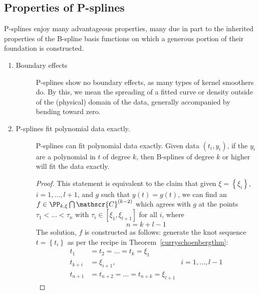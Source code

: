 \documentclass[12pt]{article}
\begin{document}

\subsection{Properties of P-splines}

P-splines enjoy many advantageous properties, many due in part to the inherited properties of the B-spline basis functions on which a generous portion of their foundation is constructed. 

\begin{enumerate} \label{eq:PS_properties}
\item \begin{description}\item[Boundary effects]
 P-splines show no boundary effects, as many types of kernel smoothers do. By this, we mean the spreading of a fitted curve or density outside of the (physical) domain of the data, generally accompanied by bending toward zero.
\end{description}
\item \begin{description}\item[P-splines fit polynomial data exactly.] 
P-splines can fit polynomial data exactly. Given data $\left(t_i,y_i\right)$, if the $y_i$ are a polynomial in $t$ of degree $k$, then B-splines of degree $k$ or higher will fit the data exactly. 
\begin{proof}
This statement is equivalent to the claim that given $\xi = \left\{ \xi_i \right\}$, $i=1,\dots,l+1$, and $g$ such that $y\left(t\right) = g\left(t\right)$, we can find an $f \in \PP_{k,\xi} \bigcap \mathscr{C}^{\left(k-2\right)}$ which agrees with $g$ at the points $\tau_1 < \dots < \tau_n$  with $\tau_i \in \left[\xi_1,\xi_{l+1}\right]$ for all $i$, where
\[
n=k+l-1
\]
The solution, $f$ is constructed as follows: generate the knot sequence $t = \left\{t_i\right\}$ as per the recipe in Theorem~\ref{curryschoenbergthm}:
\begin{align*}
t_1 &= t_2 = \dots = t_k = \xi_1 & \\
t_{k+i} &= \xi_{i+1}, & i=1,\dots,l-1\\
t_{n+1} &= t_{n+2} = \dots = t_{n+k} = \xi_{l+1} & 
\end{align*}


\end{proof}
\end{description}
\end{enumerate}
\end{document}
